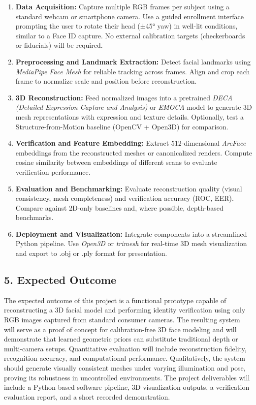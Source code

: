 \documentclass[12pt]{article}
\begin{document}
\begin{enumerate}
  \item \textbf{Data Acquisition:} Capture multiple RGB frames per subject using a standard webcam or smartphone camera. Use a guided enrollment interface prompting the user to rotate their head (±45° yaw) in well-lit conditions, similar to a Face ID capture. No external calibration targets (checkerboards or fiducials) will be required.
  \item \textbf{Preprocessing and Landmark Extraction:} Detect facial landmarks using \textit{MediaPipe Face Mesh} for reliable tracking across frames. Align and crop each frame to normalize scale and position before reconstruction.
  \item \textbf{3D Reconstruction:} Feed normalized images into a pretrained \textit{DECA (Detailed Expression Capture and Analysis)} or \textit{EMOCA} model to generate 3D mesh representations with expression and texture details. Optionally, test a Structure-from-Motion baseline (OpenCV + Open3D) for comparison.
  \item \textbf{Verification and Feature Embedding:} Extract 512-dimensional \textit{ArcFace} embeddings from the reconstructed meshes or canonicalized renders. Compute cosine similarity between embeddings of different scans to evaluate verification performance.
  \item \textbf{Evaluation and Benchmarking:} Evaluate reconstruction quality (visual consistency, mesh completeness) and verification accuracy (ROC, EER). Compare against 2D-only baselines and, where possible, depth-based benchmarks.
  \item \textbf{Deployment and Visualization:} Integrate components into a streamlined Python pipeline. Use \textit{Open3D} or \textit{trimesh} for real-time 3D mesh visualization and export to .obj or .ply format for presentation.
\end{enumerate}

\vspace{2em}

\subsection*{5. Expected Outcome}
The expected outcome of this project is a functional prototype capable of reconstructing a 3D facial model and performing identity verification using only RGB images captured from standard consumer cameras. The resulting system will serve as a proof of concept for calibration-free 3D face modeling and will demonstrate that learned geometric priors can substitute traditional depth or multi-camera setups. Quantitative evaluation will include reconstruction fidelity, recognition accuracy, and computational performance. Qualitatively, the system should generate visually consistent meshes under varying illumination and pose, proving its robustness in uncontrolled environments. The project deliverables will include a Python-based software pipeline, 3D visualization outputs, a verification evaluation report, and a short recorded demonstration.
\end{document}
